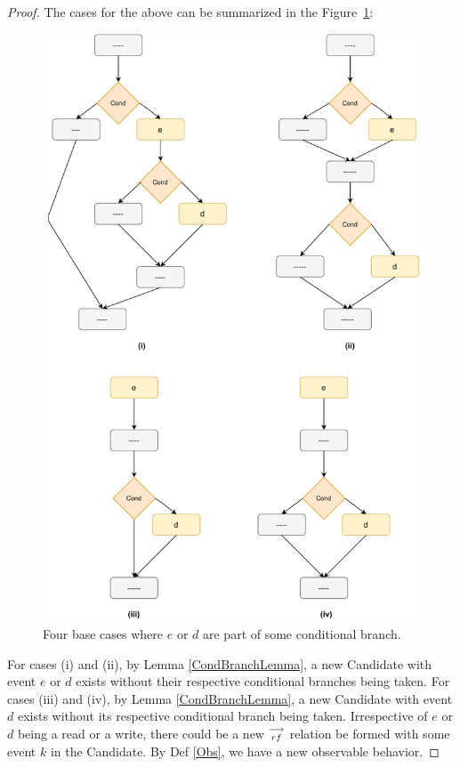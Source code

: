 \begin{proof}
            The cases for the above can be summarized in the Figure~\ref{reord:cond_branch_cases}: 
            \begin{figure}[H]
                \label{CondCases}
                \centering 
                \includegraphics[scale=0.5]{5.InstructionReordering/5.ValidReorderingProgram/ConditionalCases.pdf}
                \caption{Four base cases where $e$ or $d$ are part of some conditional branch.}
                \label{reord:cond_branch_cases}
            \end{figure}

            For cases (i) and (ii), by Lemma \ref{CondBranchLemma}, a new Candidate with event $e$ or $d$ exists without their respective conditional branches being taken.
            For cases (iii) and (iv), by Lemma \ref{CondBranchLemma}, a new Candidate with event $d$ exists without its respective conditional branch being taken.
            Irrespective of $e$ or $d$ being a read or a write, there could be a new $\stackrel{\longrightarrow}{_{rf}}$ relation be formed with some event $k$ in the Candidate. By Def \ref{Obs}, we have a new observable behavior\footnotemark. 


\end{proof}
